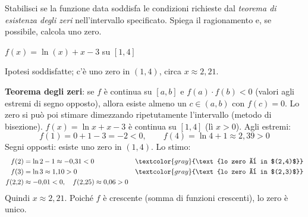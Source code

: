 \begin{question}[ID=3.3, subtitle={Teorema degli zeri per $\ln x + x - 3$ su $[1,4]$}, tags={continuità, teorema degli zeri}, difficulty=media]
Stabilisci se la funzione data soddisfa le condizioni richieste dal \textit{teorema di esistenza degli zeri} nell'intervallo specificato. Spiega il ragionamento e, se possibile, calcola uno zero.
\begin{center}
    $f(x) = \ln(x) + x - 3$ su $[1, 4]$
\end{center}
\begin{solution}
Ipotesi soddisfatte; c'è uno zero in $(1,4)$, circa $x\approx2{,}21$.
\end{solution}
\begin{explanation}
\textbf{Teorema degli zeri}: se $f$ è continua su $[a,b]$ e $f(a)\cdot f(b)<0$ (valori agli estremi di segno opposto), allora esiste almeno un $c\in(a,b)$ con $f(c)=0$. Lo zero si può poi stimare dimezzando ripetutamente l'intervallo (metodo di bisezione).
$f(x)=\ln x+x-3$ è continua su $[1,4]$ (lì $x>0$). Agli estremi:
\[ f(1)=0+1-3=-2<0, \qquad f(4)=\ln4+1\approx2{,}39>0 \]
Segni opposti: esiste uno zero in $(1,4)$. Lo stimo:
\[\begin{aligned}
f(2) &= \ln2-1\approx-0{,}31<0 && \textcolor{gray}{\text{lo zero è in $(2,4)$}}\\
f(3) &= \ln3\approx1{,}10>0 && \textcolor{gray}{\text{lo zero è in $(2,3)$}}\\
f(2{,}2) &\approx -0{,}01<0, \quad f(2{,}25)\approx0{,}06>0
\end{aligned}\]
Quindi $x\approx2{,}21$. Poiché $f$ è crescente (somma di funzioni crescenti), lo zero è unico.
\end{explanation}
\end{question}


